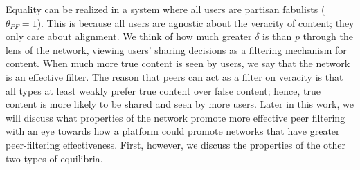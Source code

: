 Equality can be realized in a system where all users are partisan fabulists ($\theta_{PF} = 1$). This is because all users are agnostic about the veracity of content; they only care about alignment. We think of how much greater $\delta$ is than $p$ through the lens of the network, viewing users' sharing decisions as a filtering mechanism for content. When much more true content is seen by users, we say that the network is an effective filter. The reason that peers can act as a filter on veracity is that all types at least weakly prefer true content over false content; hence, true content is more likely to be shared and seen by more users.  Later in this work, we will discuss what properties of the network promote more effective peer filtering with an eye towards how a platform could promote networks that have greater peer-filtering effectiveness. First, however, we discuss the properties of the other two types of equilibria. 

